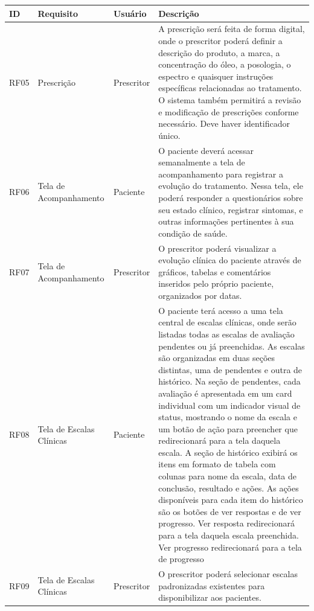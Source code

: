 \href{}{}\documentclass[12pt,portuguese,oneside]{article}
\begin{document}
\begin{table}[H]
\begin{tabularx}{\textwidth}{|>{\raggedright\arraybackslash}p{1cm}|>{\raggedright\arraybackslash}p{2.5cm}|>{\raggedright\arraybackslash}p{2cm}|>{\raggedright\arraybackslash}X|}
\hline
\end{tabularx}
\end{table}

\newpage

\begin{table}[H]
\centering
{}
\begin{tabularx}{\textwidth}{|>{\raggedright\arraybackslash}p{1cm}|>{\raggedright\arraybackslash}p{3cm}|>{\raggedright\arraybackslash}p{2cm}|>{\raggedright\arraybackslash}X|}
\hline
\rowcolor{gray!20}
\textbf{ID} & \textbf{Requisito} & \textbf{Usuário} & \textbf{Descrição}\\
\hline
RF05 & Prescrição & Prescritor & A prescrição será feita de forma digital, onde o prescritor poderá definir a descrição do produto, a marca, a concentração do óleo, a posologia, o espectro e quaisquer instruções específicas relacionadas ao tratamento. O sistema também permitirá a revisão e modificação de prescrições conforme necessário. Deve haver identificador único.\\
\hline
RF06 & Tela de Acompanhamento & Paciente & O paciente deverá acessar semanalmente a tela de acompanhamento para registrar a evolução do tratamento. Nessa tela, ele poderá responder a questionários sobre seu estado clínico, registrar sintomas, e outras informações pertinentes à sua condição de saúde.\\
\hline
RF07 & Tela de Acompanhamento & Prescritor & O prescritor poderá visualizar a evolução clínica do paciente através de gráficos, tabelas e comentários inseridos pelo próprio paciente, organizados por datas.\\
\hline
RF08 & Tela de Escalas Clínicas & Paciente & O paciente terá acesso a uma tela central de escalas clínicas, onde serão listadas todas as escalas de avaliação pendentes ou já preenchidas. As escalas são organizadas em duas seções distintas, uma de pendentes e outra de histórico. Na seção de pendentes, cada avaliação é apresentada em um card individual com um indicador visual de status, mostrando o nome da escala e um botão de ação para preencher que redirecionará para a tela daquela escala. A seção de histórico exibirá os itens em formato de tabela com colunas para nome da escala, data de conclusão, resultado e ações. As ações disponíveis para cada item do histórico são os botões de ver respostas e de ver progresso. Ver resposta redirecionará para a tela daquela escala preenchida. Ver progresso redirecionará para a tela de progresso\\
\hline
RF09 & Tela de Escalas Clínicas & Prescritor & O prescritor poderá selecionar escalas padronizadas existentes para disponibilizar aos pacientes.\\
\hline
\end{tabularx}
\end{table}
\end{document}
